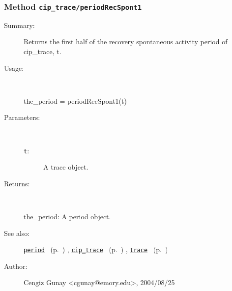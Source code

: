 \subsubsection[Method \texttt{periodRecSpont1}]{Method \texttt{cip\_trace/periodRecSpont1}}%
%
\label{ref_cip_trace__periodRecSpont1}%
\hypertarget{ref_cip_trace__periodRecSpont1}{}%
\begin{description}
\item[Summary:]Returns the first half of the recovery spontaneous
		 activity period of cip\_trace, t. 
%
\item[Usage:]~%
\begin{lyxcode}%
the\_period = periodRecSpont1(t)
%
\end{lyxcode}%
%
%
\item[Parameters:]~
\begin{description}%
\item[\texttt{t}:]
 A trace object.
\end{description}%
%
\item[Returns:]~

	the\_period: A period object.
%
%
\item[See also:]%
\hyperlink{ref_period}{\texttt{period}}%
\ (p.~\pageref{ref_period})%
%
, \hyperlink{ref_cip_trace}{\texttt{cip\_trace}}%
\ (p.~\pageref{ref_cip_trace})%
%
, \hyperlink{ref_trace}{\texttt{trace}}%
\ (p.~\pageref{ref_trace})%
%
%
\item[Author:]%
Cengiz Gunay <cgunay@emory.edu>, 2004/08/25%
\end{description}
\methodline%

